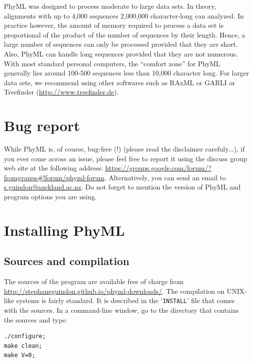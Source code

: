 \documentclass[a4paper,12pt]{article}
\newcommand{\x}[1]{\texttt{#1}}
\begin{document}
PhyML was designed to  process moderate to large data sets.  In theory,  alignments with up to 4,000
sequences 2,000,000 character-long can analyzed.  In practice however, the amount of memory required
to process  a data set is proportional  of the product of  the number of sequences  by their length.
Hence, a large number  of sequences can only be processed provided that  they are short. Also, PhyML
can  handle long  sequences  provided  that they  are  not numerous.   With  most standard  personal
computers, the ``comfort  zone'' for PhyML generally lies around 100-500  sequences less than 10,000
character  long.   For  larger  data  sets,  we  recommend  using  other  softwares  such  as  RAxML
\cite{raxml}      or       GARLI      \cite{garli}      or      Treefinder
(\href{http://www.treefinder.de}{http://www.treefinder.de}).


\section{Bug report}

While PhyML is, of  course, bug-free (!) (please read the disclaimer  carefuly...), if you ever come
across an  issue, please feel free to  report it using the  discuss group web site  at the following
address:  \url{https://groups.google.com/forum/?fromgroups#!forum/phyml-forum}.  Alternatively,  you
can send an email  to \url{s.guindon@auckland.ac.nz}. Do not forget to mention  the version of PhyML
and program options you are using.


\section{Installing PhyML}

\subsection{Sources and compilation}

The sources of the  program are available free of charge from \url{http://stephaneguindon.github.io/phyml-downloads/}.  The  compilation on UNIX-like
systems  is  fairly standard.  It  is  described  in the  `\x{INSTALL}'  file  that comes  with  the
sources. In a command-line window, go to the directory that contains the sources and type:

{\setlength{\baselineskip}{0.5\baselineskip}
\begin{verbatim}
./configure;
make clean;
make V=0;
\end{verbatim}
}
\end{document}

